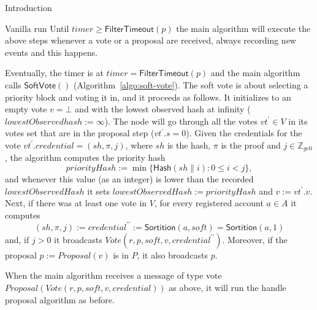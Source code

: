 \documentclass[10pt,a4paper]{article}
\begin{document}
\begin{section}{Introduction}
\begin{subsection}{Vanilla run}
Until $timer\ge \mathsf{FilterTimeout}(p)$ the main algorithm will execute the above steps
whenever a vote or a proposal are received, always recording new events and this happens.

Eventually, the timer is at $timer=\mathsf{FilterTimeout}(p)$ and the main algorithm calls 
$\mathsf{SoftVote()}$ (Algorithm~\ref{algo:soft-vote}).
The soft vote is about selecting a priority block and voting it in, and it proceeds as follows.
It initializes to an empty vote $v=\bot$ and with the lowest observed hash at infinity ($lowestObservedhash:=\infty$).
The node will go through all the votes $vt^\prime\in V$ in its votes set that are in the
proposal step ($vt^\prime.s=0$).
Given the credentials for the vote $vt^\prime.credential=(sh,\pi, j)$, where $sh$ is the hash,
$\pi$ is the proof and $j\in\mathbb{Z}_{ge 0}$, the algorithm computes the priority hash
$$
priorityHash:=\min\{\mathsf{Hash}(sh\| i): 0\le i<j\},
$$
and whenever this value (as an integer) is lower than the recorded 
$lowestObservedHash$ it sets 
$lowestObservedHash:=priorityHash$ and $v:=vt^\prime.v$.
Next, if there was at least one vote in $V$, for every registered account $a\in A$
it computes 
$$
(sh,\pi,j):=credential^{\prime\prime}:=\mathsf{Sortition}(a,soft)=\mathsf{Sortition}(a,1)
$$
and, if $j>0$ it broadcasts $Vote(r,p,soft,v,credential^{\prime\prime})$.
Moreover, if the proposal $p:=Proposal(v)$ is in $P$, it also broadcasts $p$.

When the main algorithm receives a message of type vote 
$Proposal(Vote(r,p,soft,v,credential))$ as above, it will
run the handle proposal algorithm as before.


\end{subsection}
\end{section}
\end{document}
